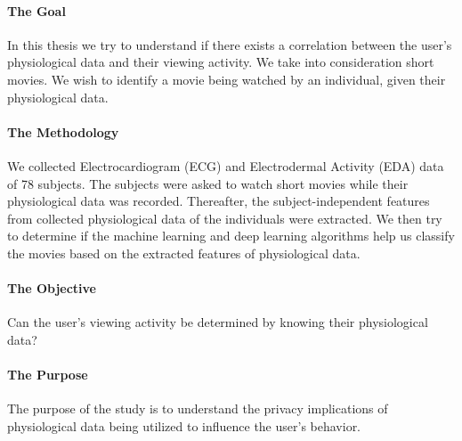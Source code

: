 \paragraph{The Goal} In this thesis we try to understand if there exists a correlation between the user's physiological data and their viewing activity. We take into consideration short movies. We wish to identify a movie being watched by an individual, given their physiological data.

\paragraph{The Methodology} \label{sec:the_methodology} We collected Electrocardiogram (ECG) and Electrodermal Activity (EDA) data of 78 subjects. The subjects were asked to watch short movies while their physiological data was recorded. Thereafter, the subject-independent features from collected physiological data of the individuals were extracted. We then try to determine if the machine learning and deep learning algorithms help us classify the movies based on the extracted features of physiological data.

\paragraph{The Objective} Can the user's viewing activity be determined by knowing their physiological data?

\paragraph{The Purpose} The purpose of the study is to understand the privacy implications of physiological data being utilized to influence the user's behavior.

